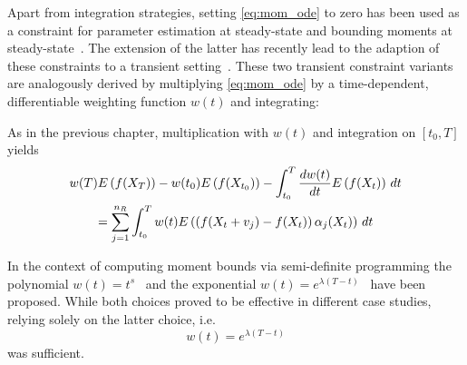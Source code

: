 Apart from integration strategies,
setting \eqref{eq:mom_ode} to zero has been used as a constraint for parameter estimation at steady-state
\cite{backenkohler2018moment} and bounding moments at steady-state~\cite{dowdy2018bounds,ghusinga2017exact,kuntz2017rigorous}.
The extension of the latter has recently lead to the adaption of these constraints
to a transient setting~\cite{dowdy2018dynamic,sakurai2019bounding}.
These two transient constraint variants are analogously derived by multiplying \eqref{eq:mom_ode}
by a time-dependent, differentiable weighting function $w(t)$ and integrating:

As in the previous chapter, multiplication with $w(t)$ and integration on $[t_0, T]$ yields~\cite{dowdy2018dynamic,sakurai2019bounding}
\begin{multline}\label{eq:poly_con}
        w(T){E}\left(f(X_{T})\right)
        - w(t_0){E}\left(f(X_{t_0})\right)
	- \int_{t_0}^{T}\frac{dw(t)}{dt}{E}\left(f(X_t)\right)\,dt\\
        =\sum_{j=1}^{n_R}\int_{t_0}^{T}w(t)
        {E}\left(\left(f{(X_t + v_j)} - f(X_t)\right)\alpha_j(X_t)\right)\,dt
\end{multline}

In the context of computing moment bounds via semi-definite programming
the polynomial $w(t)=t^s$~\cite{sakurai2019bounding} and the exponential $w(t)=e^{\lambda(T - t)}$~\cite{dowdy2018dynamic}
have been proposed.
While both choices proved to be effective in different case studies, relying solely on the latter choice,
i.e.\ \[
	w(t)=e^{\lambda(T - t)} \] was sufficient.

